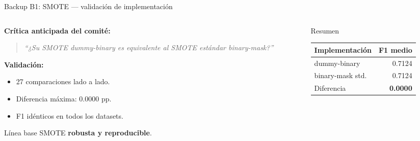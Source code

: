 \begin{frame}{Backup B1: SMOTE — validación de implementación}
\small
\begin{columns}[T]

\begin{column}{0.55\textwidth}
\textbf{Crítica anticipada del comité:}
\begin{quote}\itshape\scriptsize
``¿Su SMOTE \textit{dummy-binary} es equivalente al SMOTE estándar binary-mask?''
\end{quote}

\textbf{Validación:}
\begin{itemize}\setlength\itemsep{0pt}
  \item 27 comparaciones lado a lado.
  \item Diferencia máxima: $0{.}0000$ pp.
  \item F1 idénticos en todos los datasets.
\end{itemize}

\vspace{0.3em}
\begin{insight}
\scriptsize Línea base SMOTE \textbf{robusta y reproducible}.
\end{insight}
\end{column}

\begin{column}{0.45\textwidth}
\centering
{}
\begin{block}{Resumen}
\scriptsize
\begin{tabular}{@{}lr@{}}
\toprule
Implementación   & F1 medio \\
\midrule
dummy-binary     & 0.7124 \\
binary-mask std. & 0.7124 \\
\midrule
Diferencia       & \textbf{0.0000} \\
\bottomrule
\end{tabular}
\end{block}
\end{column}

\end{columns}
\end{frame}


